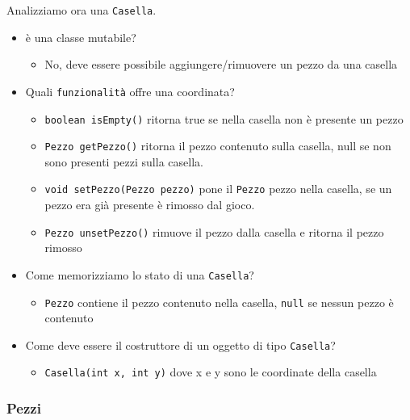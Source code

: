 \documentclass{article}
\begin{document}
Analizziamo ora una \texttt{Casella}.

\begin{itemize}
\item \`e una classe mutabile?
\begin{itemize}
\item No, deve essere possibile aggiungere/rimuovere un pezzo da una casella
\end{itemize}
\item Quali \texttt{funzionalit\`a} offre una coordinata? 
\begin{itemize}
\item \texttt{boolean isEmpty()} ritorna true se nella casella non \`e presente un pezzo
\item \texttt{Pezzo getPezzo()} ritorna il pezzo contenuto sulla casella, null se non sono presenti pezzi sulla casella.
\item \texttt{void setPezzo(Pezzo pezzo)} pone il \texttt{Pezzo} pezzo nella casella, se un pezzo era gi\`a presente \`e rimosso dal gioco.
\item \texttt{Pezzo unsetPezzo()} rimuove il pezzo dalla casella e ritorna il pezzo rimosso
\end{itemize}
\item Come memorizziamo lo stato di una \texttt{Casella}?
\begin{itemize}
\item \texttt{Pezzo} contiene il pezzo contenuto nella casella, \texttt{null} se nessun pezzo \`e contenuto
\end{itemize}
\item Come deve essere il costruttore di un oggetto di tipo \texttt{Casella}?
\begin{itemize}
\item \texttt{Casella(int x, int y)} dove x e y sono le coordinate della casella
\end{itemize}
\end{itemize}



\subsubsection{Pezzi}
\end{document}
